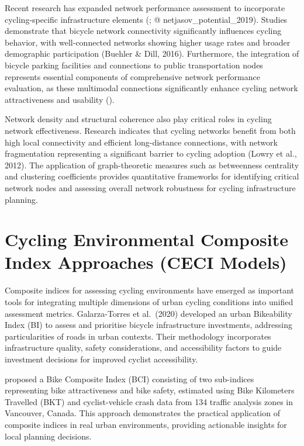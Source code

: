 \documentclass[
  12pt,
  oneside]{book}
\begin{document}
Recent research has expanded network performance assessment to incorporate cycling-specific infrastructure elements (\textcite{lovelace_propensity_2017}; @ netjasov\_potential\_2019). Studies demonstrate that bicycle network connectivity significantly influences cycling behavior, with well-connected networks showing higher usage rates and broader demographic participation (Buehler \& Dill, 2016). Furthermore, the integration of bicycle parking facilities and connections to public transportation nodes represents essential components of comprehensive network performance evaluation, as these multimodal connections significantly enhance cycling network attractiveness and usability (\textcite{geurs_multi-modal_2016}).

Network density and structural coherence also play critical roles in cycling network effectiveness. Research indicates that cycling networks benefit from both high local connectivity and efficient long-distance connections, with network fragmentation representing a significant barrier to cycling adoption (Lowry et al., 2012). The application of graph-theoretic measures such as betweenness centrality and clustering coefficients provides quantitative frameworks for identifying critical network nodes and assessing overall network robustness for cycling infrastructure planning.

\section{Cycling Environmental Composite Index Approaches (CECI Models)}\label{cycling-environmental-composite-index-approaches-ceci-models}

Composite indices for assessing cycling environments have emerged as important tools for integrating multiple dimensions of urban cycling conditions into unified assessment metrics. Galarza-Torres et al.~(2020) developed an urban Bikeability Index (BI) to assess and prioritise bicycle infrastructure investments, addressing particularities of roads in urban contexts. Their methodology incorporates infrastructure quality, safety considerations, and accessibility factors to guide investment decisions for improved cyclist accessibility.

\textcite{kamel_composite_2020} proposed a Bike Composite Index (BCI) consisting of two sub-indices representing bike attractiveness and bike safety, estimated using Bike Kilometers Travelled (BKT) and cyclist-vehicle crash data from 134 traffic analysis zones in Vancouver, Canada. This approach demonstrates the practical application of composite indices in real urban environments, providing actionable insights for local planning decisions.
\end{document}
